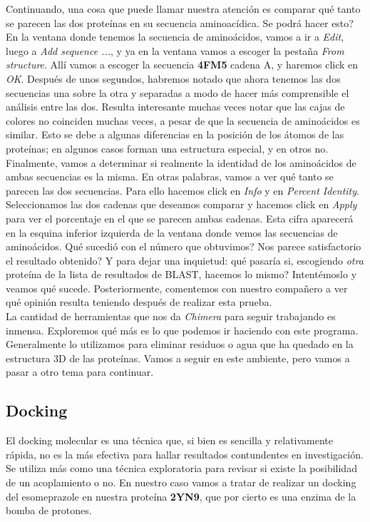 \documentclass[10pt,letterpaper]{article}
\begin{document}
Continuando, una cosa que puede llamar nuestra atenci\'on es comparar qu\'e tanto se parecen las dos prote\'inas en su secuencia aminoac\'idica. Se podr\'a hacer esto? En la ventana donde tenemos la secuencia de amino\'acidos, vamos a ir a \emph{Edit}, luego a \emph{Add sequence ...}, y ya en la ventana vamos a escoger la pesta\~na \emph{From structure}. All\'i vamos a escoger la secuencia \textbf{4FM5} cadena A, y haremos click en \emph{OK}. Despu\'es de unos segundos, habremos notado que ahora tenemos las dos secuencias una sobre la otra y separadas a modo de hacer m\'as comprensible el an\'alisis entre las dos. Resulta interesante muchas veces notar que las cajas de colores no coinciden muchas veces, a pesar de que la secuencia de amino\'acidos es similar. Esto se debe a algunas diferencias en la posici\'on de los \'atomos de las prote\'inas; en algunos casos forman una estructura especial, y en otros no.\\

Finalmente, vamos a determinar si realmente la identidad de los amino\'acidos de ambas secuencias es la misma. En otras palabras, vamos a ver qu\'e tanto se parecen las dos secuencias. Para ello hacemos click en \emph{Info} y en \emph{Percent Identity}. Seleccionamos las dos cadenas que deseamos comparar y hacemos click en \emph{Apply} para ver el porcentaje en el que se parecen ambas cadenas. Esta cifra aparecer\'a en la esquina inferior izquierda de la ventana donde vemos las secuencias de amino\'acidos. Qu\'e sucedi\'o con el n\'umero que obtuvimos? Nos parece satisfactorio el resultado obtenido? Y para dejar una inquietud: qu\'e pasar\'ia si, escogiendo \emph{otra} prote\'ina de la lista de resultados de BLAST, hacemos lo mismo? Intent\'emoslo y veamos qu\'e sucede. Posteriormente, comentemos con nuestro compa\~nero a ver qu\'e opini\'on resulta teniendo despu\'es de realizar esta prueba.\\

La cantidad de herramientas que nos da \textit{Chimera} para seguir trabajando es inmensa. Exploremos qu\'e m\'as es lo que podemos ir haciendo con este programa. Generalmente lo utilizamos para eliminar residuos o agua que ha quedado en la estructura 3D de las prote\'inas. Vamos a seguir en este ambiente, pero vamos a pasar a otro tema para continuar.

\subsection{Docking}
El docking molecular es una t\'ecnica que, si bien es sencilla y relativamente r\'apida, no es la m\'as efectiva para hallar resultados contundentes en investigaci\'on. Se utiliza m\'as como una t\'ecnica exploratoria para revisar si existe la posibilidad de un acoplamiento o no. En nuestro caso vamos a tratar de realizar un docking del esomeprazole en nuestra prote\'ina \textbf{2YN9}, que por cierto es una enzima de la bomba de protones.\\
\end{document}
